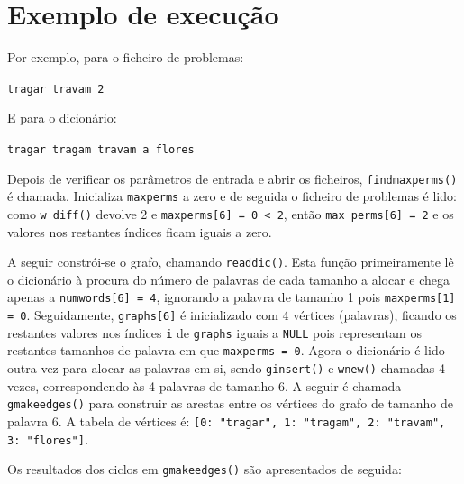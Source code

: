 \documentclass[portuguese, a4paper]{article}
\newcommand\tu[0]{\textunderscore}
\begin{document}
\section{Exemplo de execução}
	\par
	Por exemplo, para o ficheiro de problemas:
	\begin{center}
		\texttt{tragar travam 2}
	\end{center}
	\par
	E para o dicionário:
	\begin{center}
		\texttt{tragar tragam travam a flores}
	\end{center}
	\par
	Depois de verificar os parâmetros de entrada e abrir os ficheiros,
	\texttt{find\tu max\tu perms()} é chamada.  Inicializa \texttt{max\tu perms}
	a zero e de seguida o ficheiro de problemas é lido: como \texttt{w\tu
	diff()} devolve 2 e \texttt{max\tu perms[6] = 0 < 2}, então \texttt{max\tu
	perms[6] = 2} e os valores nos restantes índices ficam iguais a zero.
	\par
	A seguir constrói-se o grafo, chamando \texttt{read\tu dic()}. Esta função
	primeiramente lê o dicionário à procura do número de palavras de cada
	tamanho a alocar e chega apenas a \texttt{num\tu words[6] = 4}, ignorando a
	palavra de tamanho 1  pois \texttt{max\tu perms[1] = 0}. Seguidamente,
	\texttt{graphs[6]} é inicializado com 4 vértices (palavras), ficando os
	restantes valores nos índices \texttt{i} de \texttt{graphs} iguais a
	\texttt{NULL} pois representam os restantes tamanhos de palavra em que
	\texttt{max\tu perms = 0}. Agora o dicionário é lido outra vez para alocar
	as palavras em si, sendo \texttt{g\tu insert()} e \texttt{w\tu new()}
	chamadas 4 vezes, correspondendo às 4 palavras de tamanho 6. A seguir é
	chamada \texttt{g\tu make\tu edges()} para construir as arestas entre os
	vértices do grafo de tamanho de palavra 6. A tabela de vértices é:
	\texttt{[0: "tragar", 1: "tragam", 2: "travam", 3: "flores"]}.
	\par
	Os resultados dos ciclos em \texttt{g\tu make\tu edges()} são apresentados
	de seguida:
\end{document}
